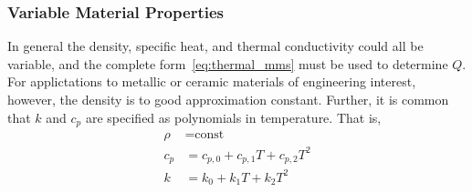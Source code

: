 \subsubsection{Variable Material Properties}
In general the density, specific heat, and thermal conductivity could all be variable, and the complete form~\eqref{eq:thermal_mms} must be used to determine $Q$.  For applictations to metallic or ceramic materials of engineering interest, however, the density is to good approximation constant.  Further, it is common that $k$ and $c_p$ are specified as polynomials in temperature.  That is, 
\begin{align}
  \rho &= \text{const} \\ 
   c_p &= c_{p,0}+ c_{p,1} T + c_{p,2} T^2 \\
     k &= k_0 + k_1 T + k_2 T^2
\end{align}




